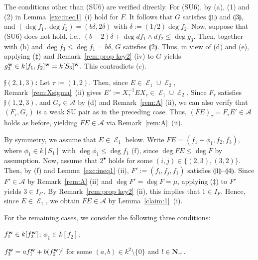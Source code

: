 \documentclass{amsart}
\theoremstyle{plain}
\theoremstyle{definition}
\newcommand{\maru}[1]{{\ooalign{\small\hfil#1\/\hfil\crcr
\raise.167ex\hbox{\mathhexbox20D}}}}
\newcommand{\A}{\mathcal{A}}
\newcommand{\E }{{\mathop{\mathcal{E}}\nolimits}}
\newcommand{\zs}{\{ 0\} }
\newcommand{\sm}{\setminus}
\newcommand{\nd}{\noindent}
\newcommand{\N}{{\bf N}}
\newcommand{\w}{{\bf w}}
\begin{document}
The conditions other than (SU6) are verified directly. 
For (SU6), by (a), (1) and (2) in 
Lemma~\ref{exc:ineq1}~(i) hold for $F$. 
It follows that $G$ satisfies 
$\llparenthesis 1 \rrparenthesis$ and $\llparenthesis 3 \rrparenthesis$, 
and $(\deg f_1,\deg f_2)=(b\delta ,2\delta )$ 
with $\delta :=(1/2)\deg f_2$. 
Now, suppose that (SU6) does not hold, 
i.e., 
$(b-2)\delta +\deg df_1\wedge df_2\le \deg g_3$. 
Then, 
together with (b) and $\deg f_3\le \deg f_1=b\delta $, 
$G$ satisfies $\llparenthesis 2 \rrparenthesis$. 
Thus, 
in view of (d) and (e), 
applying ($\ddag $) and Remark~\ref{rem:prop key2} (iv) to $G$ 
yields $g_3^{\w }\in k[f_1,f_2]^{\w }=k[S_3]^{\w }$. 
This contradicts (c). 


\nd $\mathfrak{f}(2,1,3)$\textbf{:}  
Let $\tau :=(1,2)$. Then, 
since $E\in \E _1\cup \E _2$, 
Remark~\ref{rem:Xsigma}~(ii) gives 
$E':=X_\tau ^{-1}EX_\tau \in \E _1\cup \E _2$. 
Since 
$F_\tau$ satisfies $\mathfrak{f}(1,2,3)$, 
and $G_\tau \in \A $ by (d) and Remark~\ref{rem:A} (ii), 
we can also verify that 
$(F_\tau ,G_\tau )$ is a weak SU pair as in the preceding case. 
Thus, 
$(FE)_\tau =F_\tau E'\in \A $ holds as before, 
yielding $FE\in \A $ via Remark~\ref{rem:A}~(ii). 


\smallskip 


By symmetry, we assume that $E\in \E _1$ below. 
Write $FE=(f_1+\phi _1,f_2,f_3)$, 
where $\phi _1\in k[S_1]$ 
with $\deg \phi _1\le \deg f_1$ (f), 
since $\deg FE\le \deg F$ by assumption. 
Now, assume that $2^\bullet $ 
holds for some $(i,j)\in \{ (2,3),(3,2)\} $. 
Then, 
by (f) and Lemma~\ref{exc:ineq1} (ii), 
$F':=(f_i,f_j,f_1)$ satisfies 
$\llparenthesis 1 \rrparenthesis$--$\llparenthesis 4 \rrparenthesis$. 
Since $F'\in \A $ by Remark~\ref{rem:A} (ii) 
and $\deg F'=\deg F=\mu $, 
applying ($\ddag $) to $F'$ yields $3\in I_{F'}$. 
By Remark~\ref{rem:prop key2} (ii), 
this implies that $1\in I_F$. 
Hence, since $E\in \E _1$, we obtain $FE\in \A $ by Lemma~\ref{claim:1}~(i). 



\smallskip 



For the remaining cases, 
we consider the following three conditions: 


\maru{1} $f_1^{\w }\in k[f_2^{\w }]$; \quad 
\maru{2} $\phi _1\in k[f_2]$; 


\maru{3} 
$f_3^{\w }=af_1^{\w }+b(f_2^{\w })^l$ 
for some $(a,b)\in k^2\sm \zs $ and $l\in \N _+$. 
\end{document}
